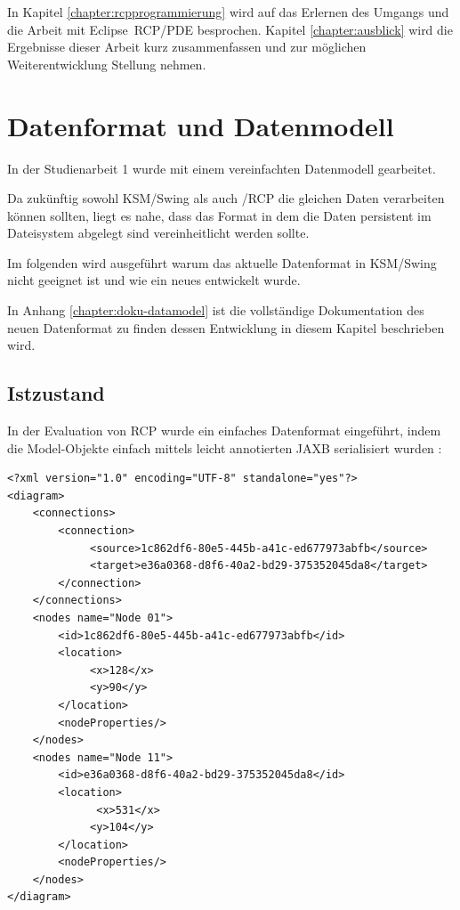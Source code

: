 \documentclass[%
12pt,titlepage,abstracton,DIV=10]{scrreprt}
\begin{document}
In Kapitel \ref{chapter:rcpprogrammierung} wird auf das Erlernen des Umgangs und
die Arbeit mit Eclipse~RCP/PDE besprochen. Kapitel \ref{chapter:ausblick}
wird die Ergebnisse dieser Arbeit kurz zusammenfassen und zur möglichen
Weiterentwicklung Stellung nehmen.

\chapter{Datenformat und Datenmodell}
In der Studienarbeit 1 wurde mit einem vereinfachten Datenmodell gearbeitet.

Da zukünftig sowohl KSM/Swing als auch /RCP die gleichen Daten verarbeiten
können sollten, liegt es nahe, dass das Format in dem die Daten persistent im
Dateisystem abgelegt sind vereinheitlicht werden sollte.

Im folgenden wird ausgeführt warum das aktuelle Datenformat in KSM/Swing nicht
geeignet ist und wie ein neues entwickelt wurde.

\par
\begingroup
\leftskip=1.5cm %
\noindent In Anhang \ref{chapter:doku-datamodel} ist die vollständige Dokumentation des
neuen Datenformat zu finden dessen Entwicklung in diesem Kapitel beschrieben
wird.
\par
\endgroup

\section{Istzustand}
In der Evaluation von RCP wurde ein einfaches Datenformat eingeführt, indem die
Model-Objekte einfach mittels leicht annotierten JAXB serialisiert wurden
\cite[S. 22f]{fischer10}: {\small
\begin{verbatim}
<?xml version="1.0" encoding="UTF-8" standalone="yes"?>
<diagram>
    <connections>
        <connection>
             <source>1c862df6-80e5-445b-a41c-ed677973abfb</source>
             <target>e36a0368-d8f6-40a2-bd29-375352045da8</target>
        </connection>
    </connections>
    <nodes name="Node 01">
        <id>1c862df6-80e5-445b-a41c-ed677973abfb</id>
        <location>
             <x>128</x>
             <y>90</y>
        </location>
        <nodeProperties/>
    </nodes>
    <nodes name="Node 11">
        <id>e36a0368-d8f6-40a2-bd29-375352045da8</id>
        <location>
              <x>531</x>
             <y>104</y>
        </location>
        <nodeProperties/>
    </nodes>
</diagram>
\end{verbatim}
}
\end{document}
